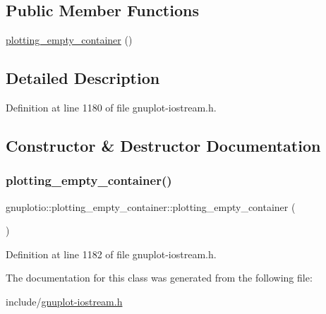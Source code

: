 \subsection*{Public Member Functions}
\begin{DoxyCompactItemize}
\item 
\hyperlink{classgnuplotio_1_1plotting__empty__container_ac6498c9ce44e48757444c8335fb544a1}{plotting\+\_\+empty\+\_\+container} ()
\end{DoxyCompactItemize}


\subsection{Detailed Description}


Definition at line 1180 of file gnuplot-\/iostream.\+h.



\subsection{Constructor \& Destructor Documentation}
\mbox{\label{classgnuplotio_1_1plotting__empty__container_ac6498c9ce44e48757444c8335fb544a1}} 
\subsubsection{\texorpdfstring{plotting\+\_\+empty\+\_\+container()}{plotting\_empty\_container()}}
{\footnotesize\ttfamily gnuplotio\+::plotting\+\_\+empty\+\_\+container\+::plotting\+\_\+empty\+\_\+container (\begin{DoxyParamCaption}{ }\end{DoxyParamCaption})\hspace{0.3cm}{\ttfamily [inline]}}



Definition at line 1182 of file gnuplot-\/iostream.\+h.



The documentation for this class was generated from the following file\+:\begin{DoxyCompactItemize}
\item 
include/\hyperlink{gnuplot-iostream_8h}{gnuplot-\/iostream.\+h}\end{DoxyCompactItemize}
